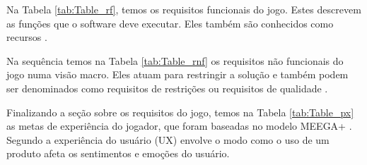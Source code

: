 Na Tabela \ref{tab:Table_rf}, temos os requisitos funcionais do jogo. Estes descrevem as funções que o software deve executar. Eles também são conhecidos como recursos \cite{Bourque_2014}. 



Na sequência temos na Tabela \ref{tab:Table_rnf} os requisitos não funcionais do jogo numa visão macro. Eles atuam para restringir a solução e também podem ser denominados como requisitos de restrições ou requisitos de qualidade \cite{Bourque_2014}.



Finalizando a seção sobre os requisitos do jogo, temos na Tabela \ref{tab:Table_px} as metas de experiência do jogador, que foram baseadas no modelo MEEGA+ \cite{Petri_Wangenheim_2019}. Segundo  a experiência do usuário (UX) envolve o modo como o uso de um produto afeta os sentimentos e emoções do usuário.









